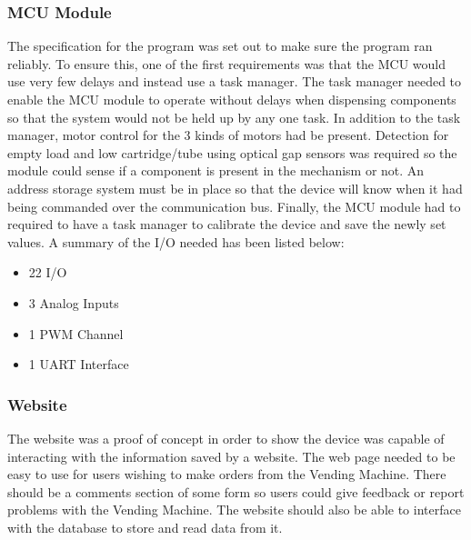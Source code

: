 \documentclass[a4paper,11pt]{article}
\numberwithin{figure}{section}
\numberwithin{table}{section}
\begin{document}
\subsubsection{MCU Module}
\label{subsec:mcuspec}
The specification for the program was set out to make sure the program ran reliably. To ensure this, one of the first requirements was that the MCU would use very few delays and instead use a task manager. The task manager needed to enable the MCU module to operate without delays when dispensing components so that the system would not be held up by any one task. In addition to the task manager, motor control for the 3 kinds of motors had be present. Detection for empty load and low cartridge/tube using optical gap sensors was required so the module could sense if a component is present in the mechanism or not. An address storage system must be in place so that the device will know when it had being commanded over the communication bus. Finally, the MCU module had to required to have a task manager to calibrate the device and save the newly set values. A summary of the I/O needed has been listed below:
	
	\begin{itemize}
	\setlength\itemsep{0em}
	\item 22 I/O
	\item 3 Analog Inputs
	\item 1 PWM Channel
	\item 1 UART Interface		
	\end{itemize}
	
\subsubsection{Website}
The website was a proof of concept in order to show the device was capable of interacting with the information saved by a website. The web page needed to be easy to use for users wishing to make orders from the Vending Machine. There should be a comments section of some form so users could give feedback or report problems with the Vending Machine. The website should also be able to interface with the database to store and read data from it.

\newpage
\end{document}
